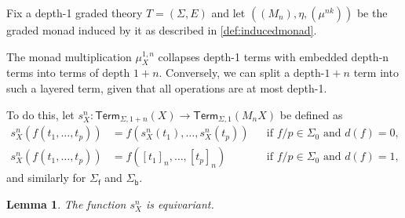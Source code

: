 \documentclass[11pt,a4paper]{amsart}
\newtheorem{lemma}[lemma]{Lemma}
\newcommand{\Term}{\mathsf{Term}}
\newcommand{\sig}{\Sigma}
\newcommand{\sigp}{\Sigma_0}
\newcommand{\sigf}{\Sigma_{\mathsf f}}
\newcommand{\sigb}{\Sigma_{\mathsf b}}
\theoremstyle{plain}
\numberwithin{equation}{section}
\newcommand{\+}[1]{\mathcal{#1}\xspace}
\theoremstyle{definition}
\begin{document}
Fix a depth-1 graded theory \(T = (\sig, E)\) and let
\(((M_n), \eta, (\mu^{nk}))\) be the graded monad induced by it as
described in \cref{def:inducedmonad}.

The monad multiplication \(\mu^{1, n}_X\) collapses depth-1 terms with embedded depth-n terms into terms of depth \(1 + n\).
Conversely, we can split a depth-\(1 + n\) term into such a layered term, given that all operations are at most depth-1.

To do this, let \(s^n_X: \Term_{\sig, 1 + n}(X) \to \Term_{\sig, 1}(M_n X)\) be defined as
\begin{align*}
    s^n_X(f(t_1, \ldots, t_p)) &= f(s^n_X(t_1), \ldots, s^n_X(t_p)) && \text{if } f/p \in \sigp \text{ and } d(f) = 0, \\
    s^n_X(f(t_1, \ldots, t_p)) &= f([t_1]_n, \ldots, [t_p]_n) && \text{if } f/p \in \sigp \text{ and } d(f) = 1,
\end{align*}
and similarly for \(\sigf\) and \(\sigb\).

\begin{lemma}\label{thm:splitequivariance}
    The function \(s^n_X\) is equivariant.
\end{lemma}
\end{document}
